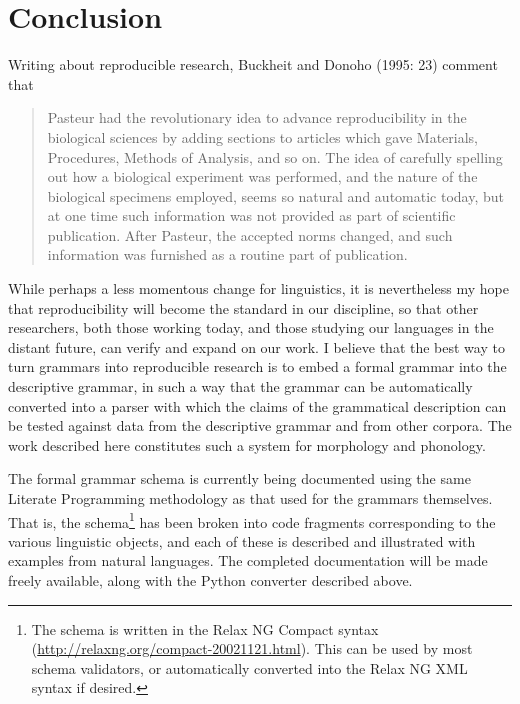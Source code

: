 \section{Conclusion}
Writing about reproducible research, Buckheit and Donoho (1995: 23) comment that

\begin{quote}
 Pasteur had the revolutionary idea to advance reproducibility in the biological sciences by adding sections to articles which gave Materials, Procedures, Methods of Analysis, and so on. The idea of carefully spelling out how a biological experiment was performed, and the nature of the biological specimens employed, seems so natural and automatic today, but at one time such information was not provided as part of scientific publication. After Pasteur, the accepted norms changed, and such information was furnished as a routine part of publication.
\end{quote} 

While perhaps a less momentous change for linguistics, it is nevertheless my hope that reproducibility will become the standard in our discipline, so that other researchers, both those working today, and those studying our languages in the distant future, can verify and expand on our work. I believe that the best way to turn grammars into reproducible research is to embed a formal grammar into the descriptive grammar, in such a way that the grammar can be automatically converted into a parser with which the claims of the grammatical description can be tested against data from the descriptive grammar and from other corpora. The work described here constitutes such a system for morphology and phonology. 

The formal grammar schema is currently being documented using the same Literate Programming methodology as that used for the grammars themselves. That is, the schema\footnote{The
  schema is written in  the Relax NG Compact syntax (\url{http://relaxng.org/compact-20021121.html}). This can be used by most schema validators, or automatically converted into the Relax NG XML syntax if desired.
} 
has been broken into code fragments corresponding to the various linguistic objects, and each of these is described and illustrated with examples from natural languages. The completed documentation will be made freely available, along with the Python converter described above.

